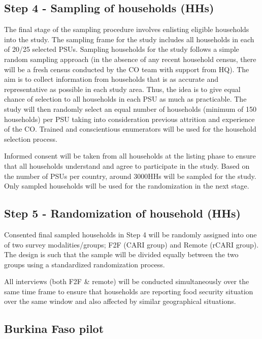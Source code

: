 \documentclass[11pt,harvard]{article}
\begin{document}
\subsection*{Step 4 - Sampling of households (HHs)}
	The final stage of the sampling procedure involves enlisting eligible households into the study. The sampling frame for the study includes all households in each of 20/25 selected PSUs. Sampling households for the study follows a simple random sampling approach (in the absence of any recent household census, there will be a fresh census conducted by the CO team with support from HQ). The aim is to collect information from households that is as accurate and representative as possible in each study area. Thus, the idea is to give equal chance of selection to all households in each PSU as much as practicable. The study will then randomly select an equal number of households (minimum of 150 households) per PSU taking into consideration previous attrition and experience of the CO. Trained and conscientious enumerators will be used for the household selection process.
	
	Informed consent will be taken from all households at the listing phase to ensure that all households understand and agree to participate in the study. Based on the number of PSUs per country, around 3000HHs will be sampled for the study. Only sampled households will be used for the randomization in the next stage.
	
\subsection*{Step 5 - Randomization of household (HHs)}
	Consented final sampled households in Step 4 will be randomly assigned into one of two survey modalities/groups; F2F (CARI group) and Remote (rCARI group). The design is such that the sample will be divided equally between the two groups using a standardized randomization process. 
	
	All interviews (both F2F \& remote) will be conducted simultaneously over the same time frame to ensure that households are reporting food security situation over the same window and also affected by similar geographical situations.
	
\pagebreak

\subsection{Burkina Faso pilot}
\end{document}

